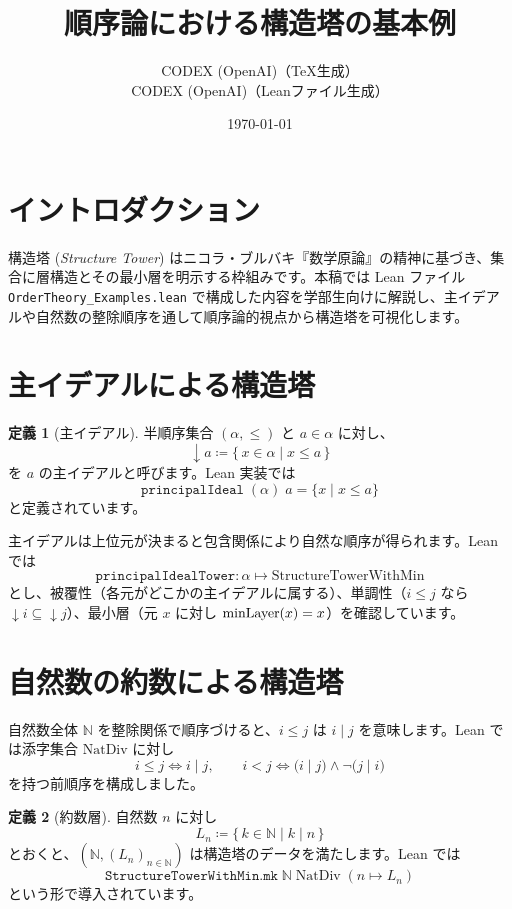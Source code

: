\documentclass[a4paper,11pt]{ltjsarticle}
\title{順序論における構造塔の基本例}
\author{CODEX (OpenAI)（TeX生成）\\CODEX (OpenAI)（Leanファイル生成）}
\date{\today}
\theoremstyle{definition}
\newtheorem{definition}{定義}
\begin{document}
\maketitle

\section{イントロダクション}

構造塔 (\emph{Structure Tower}) はニコラ・ブルバキ『数学原論』の精神に基づき、集合に層構造とその最小層を明示する枠組みです。本稿では Lean ファイル \texttt{OrderTheory\_Examples.lean} で構成した内容を学部生向けに解説し、主イデアルや自然数の整除順序を通して順序論的視点から構造塔を可視化します。

\section{主イデアルによる構造塔}

\begin{definition}[主イデアル]
半順序集合 $(\alpha,\leq)$ と $a\in \alpha$ に対し、
\[
  \downarrow a \coloneqq \{\,x\in \alpha \mid x \leq a\,\}
\]
を $a$ の主イデアルと呼びます。Lean 実装では
\[
  \texttt{principalIdeal}\;(\alpha)\;a = \{x \mid x \leq a\}
\]
と定義されています。
\end{definition}

主イデアルは上位元が決まると包含関係により自然な順序が得られます。Lean では
\[
  \texttt{principalIdealTower} : \alpha \mapsto \text{StructureTowerWithMin}
\]
とし、被覆性（各元がどこかの主イデアルに属する）、単調性（$i\leq j$ なら $\downarrow i \subseteq \downarrow j$）、最小層（元 $x$ に対し $\operatorname{minLayer}(x)=x$）を確認しています。

\section{自然数の約数による構造塔}

自然数全体 $\mathbb{N}$ を整除関係で順序づけると、$i\leq j$ は $i\mid j$ を意味します。Lean では添字集合 $\mathrm{NatDiv}$ に対し
\[
  i \leq j \iff i \mid j,\qquad i < j \iff \bigl(i \mid j\bigr)\land \neg\bigl(j \mid i\bigr)
\]
を持つ前順序を構成しました。

\begin{definition}[約数層]
自然数 $n$ に対し
\[
  L_n \coloneqq \{\,k\in \mathbb{N} \mid k\mid n\,\}
\]
とおくと、$(\mathbb{N}, (L_n)_{n\in \mathbb{N}})$ は構造塔のデータを満たします。Lean では
\[
  \texttt{StructureTowerWithMin.mk}\;\mathbb{N}\;\mathrm{NatDiv}\; (n \mapsto L_n)
\]
という形で導入されています。
\end{definition}
\end{document}
